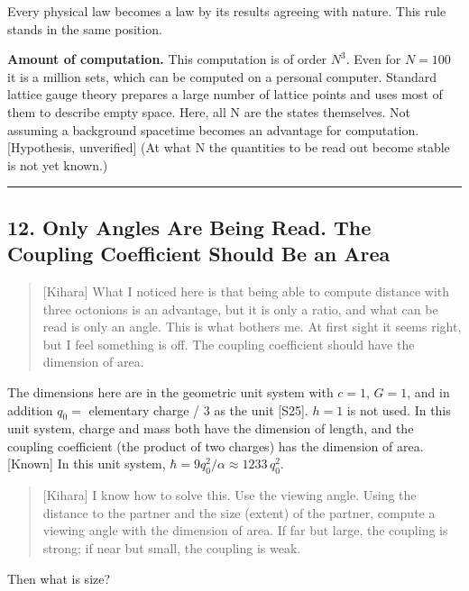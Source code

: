 \documentclass[
  a4paper,
]{article}
\begin{document}
Every physical law becomes a law by its results agreeing with nature.
This rule stands in the same position.

\textbf{Amount of computation.} This computation is of order \(N^3\).
Even for \(N = 100\) it is a million sets, which can be computed on a
personal computer. Standard lattice gauge theory prepares a large number
of lattice points and uses most of them to describe empty space. Here,
all N are the states themselves. Not assuming a background spacetime
becomes an advantage for computation. {[}Hypothesis, unverified{]} (At
what N the quantities to be read out become stable is not yet known.)

\begin{center}\rule{0.5\linewidth}{0.5pt}\end{center}

\subsection{12. Only Angles Are Being Read. The Coupling Coefficient
Should Be an
Area}\label{only-angles-are-being-read.-the-coupling-coefficient-should-be-an-area}

\begin{quote}
{[}Kihara{]} What I noticed here is that being able to compute distance
with three octonions is an advantage, but it is only a ratio, and what
can be read is only an angle. This is what bothers me. At first sight it
seems right, but I feel something is off. The coupling coefficient
should have the dimension of area.
\end{quote}

The dimensions here are in the geometric unit system with \(c = 1\),
\(G = 1\), and in addition \(q_0 =\) elementary charge / 3 as the unit
{[}S25{]}. \(h = 1\) is not used. In this unit system, charge and mass
both have the dimension of length, and the coupling coefficient (the
product of two charges) has the dimension of area. {[}Known{]} In this
unit system, \(\hbar = 9q_0^2/\alpha \approx 1233\,q_0^2\).

\begin{quote}
{[}Kihara{]} I know how to solve this. Use the viewing angle. Using the
distance to the partner and the size (extent) of the partner, compute a
viewing angle with the dimension of area. If far but large, the coupling
is strong; if near but small, the coupling is weak.
\end{quote}

Then what is size?
\end{document}
